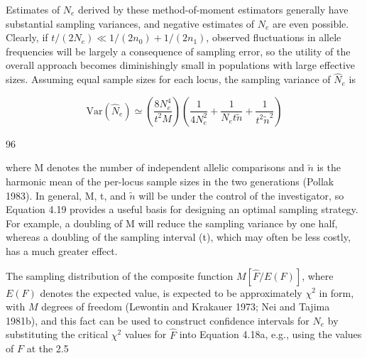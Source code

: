 \documentclass{article}
\begin{document}
Estimates of  $ N_e $ derived by these method-of-moment estimators generally have substantial sampling variances, and negative estimates of  $ N_e $ are even possible. Clearly, if  $ t/(2N_e) \ll 1/(2n_0) + 1/(2n_1) $, observed fluctuations in allele frequencies will be largely a consequence of sampling error, so the utility of the overall approach becomes diminishingly small in populations with large effective sizes. Assuming equal sample sizes for each locus, the sampling variance of  $ \widehat{N}_e $ is

\begin{equation}
\mathrm{Var}(\widehat{N}_{e})\simeq\left(\frac{8N_{e}^{4}}{t^{2}M}\right)\left(\frac{1}{4N_{e}^{2}}+\frac{1}{N_{e}t\tilde{n}}+\frac{1}{t^{2}\tilde{n}^{2}}\right)
\tag{4.19}
\label{eq:4_19}
\end{equation}

96

where M denotes the number of independent allelic comparisons and  $ \tilde{n} $ is the harmonic mean of the per-locus sample sizes in the two generations (Pollak 1983). In general, M, t, and  $ \tilde{n} $ will be under the control of the investigator, so Equation 4.19 provides a useful basis for designing an optimal sampling strategy. For example, a doubling of M will reduce the sampling variance by one half, whereas a doubling of the sampling interval (t), which may often be less costly, has a much greater effect.

The sampling distribution of the composite function  $ M[\hat{F}/E(F)] $, where  $ E(F) $ denotes the expected value, is expected to be approximately  $ \chi^2 $ in form, with  $ M $ degrees of freedom (Lewontin and Krakauer 1973; Nei and Tajima 1981b), and this fact can be used to construct confidence intervals for  $ N_e $ by substituting the critical  $ \chi^2 $ values for  $ \widehat{F} $ into Equation 4.18a, e.g., using the values of  $ F $ at the 2.5%
\end{document}
